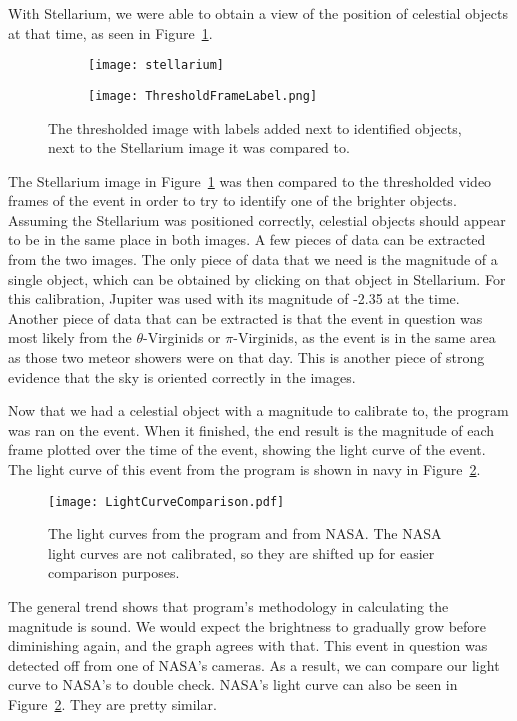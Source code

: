 With Stellarium, we were able to obtain a view of the position of celestial objects at that time, as seen in Figure~\ref{fig:Starposition}.
\begin{figure}
\centering
\begin{subfigure}{.4\textwidth}
	\centering
	\texttt{[image: stellarium]}
\end{subfigure}%
\begin{subfigure}{.4\textwidth}
	\centering
	\texttt{[image: ThresholdFrameLabel.png]}
\end{subfigure}
\caption{The thresholded image with labels added next to identified objects, next to the Stellarium image it was compared to.}
\label{fig:Starposition}
\end{figure}
The Stellarium image in Figure~\ref{fig:Starposition} was then compared to the thresholded video frames of the event in order to try to identify one of the brighter objects. Assuming the Stellarium was positioned correctly, celestial objects should appear to be in the same place in both images. A few pieces of data can be extracted from the two images. The only piece of data that we need is the magnitude of a single object, which can be obtained by clicking on that object in Stellarium. For this calibration, Jupiter was used with its magnitude of -2.35 at the time. Another piece of data that can be extracted is that the event in question was most likely from the $\theta$-Virginids or $\pi$-Virginids, as the event is in the same area as those two meteor showers were on that day. This is another piece of strong evidence that the sky is oriented correctly in the images.

Now that we had a celestial object with a magnitude to calibrate to, the program was ran on the event. When it finished, the end result is the magnitude of each frame plotted over the time of the event, showing the light curve of the event. The light curve of this event from the program is shown in navy in Figure~\ref{fig:nasa}. 
\begin{figure}[ht!]
	\centering
	\texttt{[image: LightCurveComparison.pdf]}
	\caption{The light curves from the program and from NASA. The NASA light curves are not calibrated, so they are shifted up for easier comparison purposes.}
	\label{fig:nasa}
\end{figure}
The general trend shows that program's methodology in calculating the magnitude is sound. We would expect the brightness to gradually grow before diminishing again, and the graph agrees with that. This event in question was detected off from one of NASA's cameras. As a result, we can compare our light curve to NASA's to double check. NASA's light curve can also be seen in Figure~\ref{fig:nasa}. They are pretty similar.


